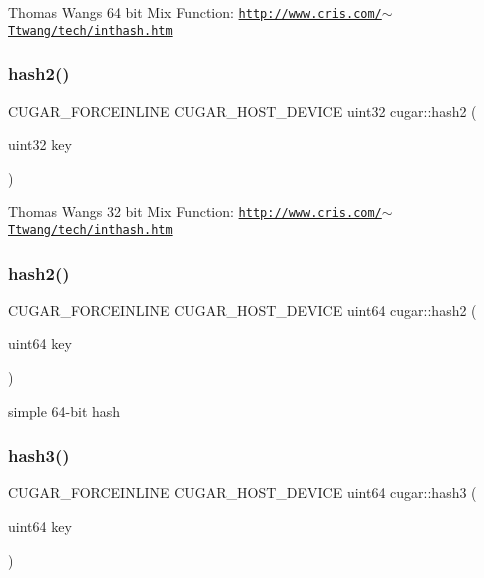Thomas Wang\textquotesingle{}s 64 bit Mix Function\+: \href{http://www.cris.com/~Ttwang/tech/inthash.htm}{\tt http\+://www.\+cris.\+com/$\sim$\+Ttwang/tech/inthash.\+htm} \mbox{\label{group___basic_ga52957987430d0e47da74bf0f6dd7fe71}} 
\subsubsection{\texorpdfstring{hash2()}{hash2()}\hspace{0.1cm}{\footnotesize\ttfamily [1/2]}}
{\footnotesize\ttfamily C\+U\+G\+A\+R\+\_\+\+F\+O\+R\+C\+E\+I\+N\+L\+I\+NE C\+U\+G\+A\+R\+\_\+\+H\+O\+S\+T\+\_\+\+D\+E\+V\+I\+CE uint32 cugar\+::hash2 (\begin{DoxyParamCaption}\item[{uint32}]{key }\end{DoxyParamCaption})}

Thomas Wang\textquotesingle{}s 32 bit Mix Function\+: \href{http://www.cris.com/~Ttwang/tech/inthash.htm}{\tt http\+://www.\+cris.\+com/$\sim$\+Ttwang/tech/inthash.\+htm} \mbox{\label{group___basic_gaa6d53e12c691996cf8e9f853af40b83c}} 
\subsubsection{\texorpdfstring{hash2()}{hash2()}\hspace{0.1cm}{\footnotesize\ttfamily [2/2]}}
{\footnotesize\ttfamily C\+U\+G\+A\+R\+\_\+\+F\+O\+R\+C\+E\+I\+N\+L\+I\+NE C\+U\+G\+A\+R\+\_\+\+H\+O\+S\+T\+\_\+\+D\+E\+V\+I\+CE uint64 cugar\+::hash2 (\begin{DoxyParamCaption}\item[{uint64}]{key }\end{DoxyParamCaption})}

simple 64-\/bit hash \mbox{\label{group___basic_ga97e40904e3a80762d095028d2539137d}} 
\subsubsection{\texorpdfstring{hash3()}{hash3()}}
{\footnotesize\ttfamily C\+U\+G\+A\+R\+\_\+\+F\+O\+R\+C\+E\+I\+N\+L\+I\+NE C\+U\+G\+A\+R\+\_\+\+H\+O\+S\+T\+\_\+\+D\+E\+V\+I\+CE uint64 cugar\+::hash3 (\begin{DoxyParamCaption}\item[{uint64}]{key }\end{DoxyParamCaption})}

